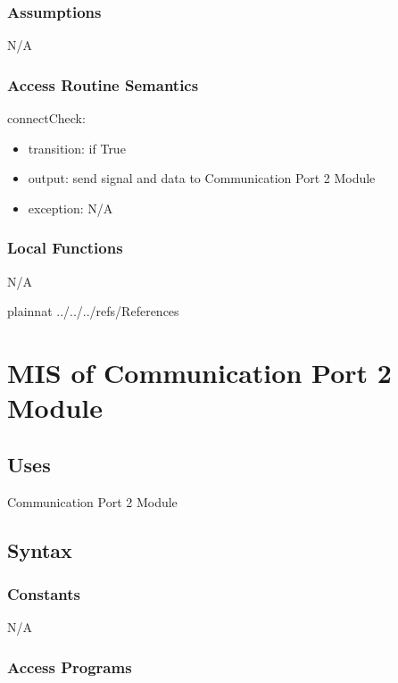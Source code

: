 \documentclass[12pt, titlepage]{article}
\begin{document}
\subsubsection{Assumptions}

N/A

\subsubsection{Access Routine Semantics}

\noindent connectCheck:
\begin{itemize}
\item transition: if True  
\item output: send signal and data to Communication Port 2 Module 
\item exception: N/A 
\end{itemize}



\subsubsection{Local Functions}

N/A

\newpage

 {plainnat}
 {../../../refs/References}

\newpage

\section{MIS of Communication Port 2 Module} 



\subsection{Uses}
Communication Port 2 Module

\subsection{Syntax}

\subsubsection{Constants}
N/A

\subsubsection{Access Programs}
\end{document}
